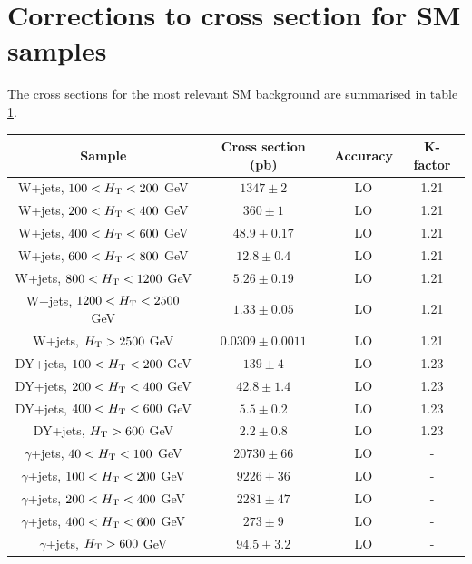 \section{Corrections to cross section for SM samples}
\label{sec:sideband_corrections}
The cross sections for the most relevant SM background are summarised in table \ref{tab:cross_sections_bkg}.

\begin{table}[!h]
  \scriptsize
  \centering
  \label{tab:cross_sections_bkg}
  \begin{tabular}
    {c|c|c|c}
    \hline\hline
    \textbf{Sample} & \textbf{Cross section (pb)} & \textbf{Accuracy} & \textbf{K-factor} \\
    \hline
    W+jets, $100 < \scalht < 200$ GeV & $1347 \pm 2$ & LO & 1.21 \\
    W+jets, $200 < \scalht < 400$ GeV & $360 \pm 1$ & LO & 1.21 \\
    W+jets, $400 < \scalht < 600$ GeV & $48.9 \pm 0.17$ & LO & 1.21 \\
    W+jets, $600 < \scalht < 800$ GeV & $12.8 \pm 0.4$ & LO & 1.21 \\
    W+jets, $800 < \scalht < 1200$ GeV & $5.26 \pm 0.19$ & LO & 1.21 \\
    W+jets, $1200 < \scalht < 2500$ GeV & $1.33 \pm 0.05$ & LO & 1.21 \\
    W+jets, $\scalht > 2500$ GeV & $0.0309 \pm 0.0011$ & LO & 1.21 \\
    \hline
    DY+jets, $100 < \scalht < 200$ GeV & $139 \pm 4$ & LO & 1.23 \\
    DY+jets, $200 < \scalht < 400$ GeV & $42.8 \pm 1.4$ & LO & 1.23 \\
    DY+jets, $400 < \scalht < 600$ GeV & $5.5 \pm 0.2$ & LO & 1.23 \\
    DY+jets, $\scalht > 600$ GeV & $2.2 \pm 0.8$ & LO & 1.23 \\
    \hline
    $\gamma$+jets, $40 < \scalht < 100$ GeV & $20730 \pm 66$ & LO & - \\
    $\gamma$+jets, $100 < \scalht < 200$ GeV & $9226 \pm 36$ & LO & - \\
    $\gamma$+jets, $200 < \scalht < 400$ GeV & $2281 \pm 47$ & LO & - \\
    $\gamma$+jets, $400 < \scalht < 600$ GeV & $273 \pm 9$ & LO & - \\
    $\gamma$+jets, $\scalht > 600$ GeV & $94.5 \pm 3.2$ & LO & - \\

\end{tabular}
\end{table}
